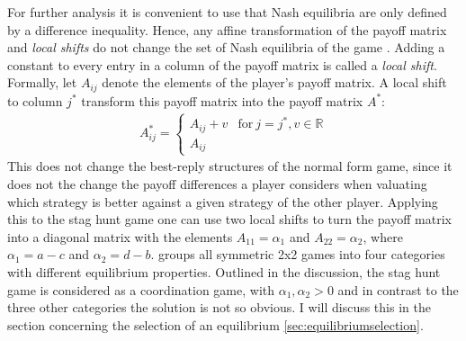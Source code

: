 \documentclass[11pt]{article}
\newcommand{\realnumb}{\mathbb{R}}
\begin{document}
For further analysis it is convenient to use that Nash equilibria are only
defined by a difference inequality. Hence, any affine transformation of the
payoff matrix and \textit{local shifts} do not change the set of Nash equilibria 
of the game \parencite[17-19]{weibull_evolutionary_1997}. 
Adding a constant to every entry in a column of the payoff matrix is called
a \textit{local shift}.
Formally, let $A_{ij}$ denote the 
elements of the player's payoff matrix. A local shift to column $j^*$ 
transform this payoff matrix into the payoff matrix $A^*$:
\begin{align}
        A^*_{ij} =
        \begin{cases}
                A_{ij} + v & \text{for}\ j=j^*, v \in \realnumb \\
                A_{ij}
        \end{cases}
\end{align}
This does not change the best-reply structures of the normal form game,
since it does not the change the payoff differences a player considers when 
valuating which strategy is better against a given strategy of the other player. 
Applying this to the stag hunt game one can use two local shifts to turn 
the payoff matrix into a diagonal matrix with the elements $A_{11}=\alpha_1$ 
and $A_{22}=\alpha_2$, where $\alpha_1=a-c$ and $\alpha_2=d-b$. 
\textcite[28]{weibull_evolutionary_1997} groups all symmetric 2x2 games into 
four categories with different equilibrium properties. 
Outlined in the discussion, the stag hunt game is considered as a coordination 
game, with $\alpha_1, \alpha_2 > 0$ and in contrast to the three other 
categories the solution is not so obvious.
I will discuss this in the section concerning the selection of an equilibrium 
\ref{sec:equilibriumselection}.
\end{document}
